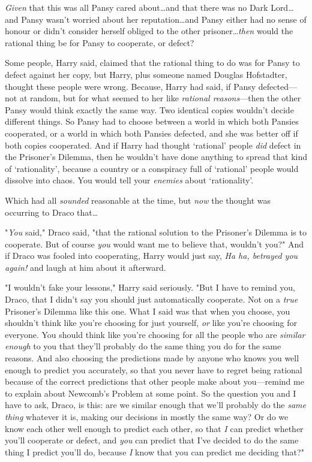 \emph{Given} that this was all Pansy cared about…and that there was no
Dark Lord…and Pansy wasn't worried about her reputation…and
Pansy either had no sense of honour or didn't consider herself obliged to the
other prisoner…\emph{then} would the rational thing be for Pansy to
cooperate, or defect?

Some people, Harry said, claimed that the rational thing to do was for Pansy to
defect against her copy, but Harry, plus someone named Douglas Hofstadter,
thought these people were wrong. Because, Harry had said, if Pansy
defected---not at random, but for what seemed to her like \emph{rational
reasons}---then the other Pansy would think exactly the same way. Two identical
copies wouldn't decide different things. So Pansy had to choose between a world
in which both Pansies cooperated, or a world in which both Pansies defected,
and she was better off if both copies cooperated. And if Harry had thought
`rational' people \emph{did} defect in the Prisoner's Dilemma, then he wouldn't
have done anything to spread that kind of `rationality', because a country or a
conspiracy full of `rational' people would dissolve into chaos. You would tell
your \emph{enemies} about `rationality'.

Which had all \emph{sounded} reasonable at the time, but \emph{now} the thought
was occurring to Draco that…

"\emph{You} said," Draco said, "that the rational solution to the Prisoner's
Dilemma is to cooperate. But of course \emph{you} would want me to believe
that, wouldn't you?" And if Draco was fooled into cooperating, Harry would just
say, \emph{Ha ha, betrayed you again!} and laugh at him about it afterward.

"I wouldn't fake your lessons," Harry said seriously. "But I have to remind
you, Draco, that I didn't say you should just automatically cooperate. Not on a
\emph{true} Prisoner's Dilemma like this one. What I said was that when you
choose, you shouldn't think like you're choosing for just yourself, \emph{or}
like you're choosing for everyone. You should think like you're choosing for
all the people who are \emph{similar enough} to you that they'll probably do
the same thing you do for the same reasons. And also choosing the predictions
made by anyone who knows you well enough to predict you accurately, so that you
never have to regret being rational because of the correct predictions that
other people make about you---remind me to explain about Newcomb's Problem at
some point. So the question you and I have to ask, Draco, is this: are we
similar enough that we'll probably do the \emph{same thing} whatever it is,
making our decisions in mostly the same way? Or do we know each other well
enough to predict each other, so that \emph{I} can predict whether you'll
cooperate or defect, and \emph{you} can predict that I've decided to do the
same thing I predict you'll do, because \emph{I} know that you can predict me
deciding that?"

